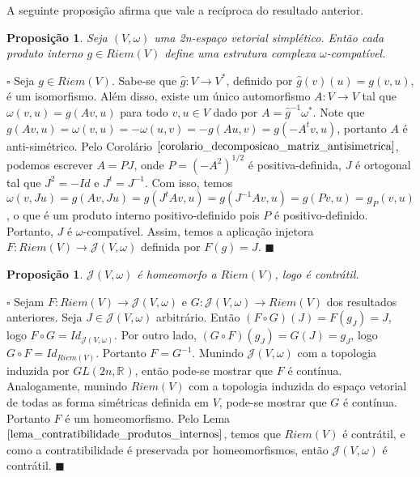\documentclass[12pt]{book}
\newtheorem{proposicao}[teorema]{Proposição}
\newenvironment{prova}[1]{$\square$ #1}{\hfill$\blacksquare$}
\newcommand{\estruturascomplexas}[2]{\mathcal{J}(#1, #2)}
\newcommand{\estruturascomplexaspadrao}{\mathcal{J}(V, \omega)}
\newcommand{\formaSimpletica}[2]{\omega(#1, #2)}
\newcommand{\generalgroup}[2]{GL(#1, #2)}
\newcommand{\generalgroupreal}[1]{\generalgroup{#1}{\real{}}}
\newcommand{\produtosinternos}[1]{Riem(#1)}
\newcommand{\real}[1]{\mathbb{R}^{#1}}
\begin{document}
	A seguinte proposição afirma que vale a recíproca do resultado anterior.
	
	\begin{proposicao}
		Seja $(V, \omega)$ uma 2n-espaço vetorial simplético. Então cada produto interno $g \in \produtosinternos{V}$ define uma estrutura complexa $\omega$-compatível.
	\end{proposicao}
	\begin{prova}
		Seja $g \in \produtosinternos{V}$. Sabe-se que $\hat{g}:V \to V^{*}$, definido por $\hat{g}(v)(u)=g(v,u)$, é um isomorfismo. Além disso, existe um único automorfismo $A:V\to V$ tal que $\formaSimpletica{v}{u} = g(Av,u)$ para todo $v,u \in V$ dado por $A = \hat{g}^{-1}\omega
		^{*}$. Note que $g(Av,u) = \formaSimpletica{v}{u} = -\formaSimpletica{u}{v} = -g(Au,v) = g(-A^{t}v,u)$, portanto $A$ é anti-simétrico. Pelo Corolário $\ref{corolario_decomposicao_matriz_antisimetrica}$, podemos escrever $A=PJ$, onde $P = (-A^{2})^{1/2}$ é positiva-definida, $J$ é ortogonal tal que $J^{2} = -Id$ e $J^{t} = J^{-1}$. Com isso, temos $\formaSimpletica{v}{Ju} = g(Av, Ju) = g(J^{t}Av, u)  = g(J^{-1}Av, u) = g(Pv, u) = g_{P}(v,u)$, o que é um produto interno positivo-definido pois $P$ é positivo-definido. Portanto, $J$ é $\omega$-compatível. Assim, temos a aplicação injetora $F: \produtosinternos{V} \to \estruturascomplexas{V}{\omega}$ definida por $F(g) = J$.
	\end{prova}
	
	\begin{proposicao}
		$\estruturascomplexaspadrao$ é homeomorfo a $\produtosinternos{V}$, logo é contrátil.
	\end{proposicao}
	\begin{prova}
		Sejam $F: \produtosinternos{V} \to \estruturascomplexaspadrao$ e $G:\estruturascomplexaspadrao \to \produtosinternos{V}$ dos resultados anteriores. Seja $J \in \estruturascomplexaspadrao$ arbitrário. Então $(F\circ G)(J) = F(g_{J}) =J$, logo $F\circ G = Id_{\estruturascomplexaspadrao}$. Por outro lado, $(G\circ F)(g_{J}) = G(J) = g_{J}$, logo $G\circ F = Id_{\produtosinternos{V}}$. Portanto $F = G^{-1}$. Munindo $\estruturascomplexaspadrao$ com a topologia induzida por $\generalgroupreal{2n}$, então pode-se mostrar que $F$ é contínua. Analogamente, munindo $\produtosinternos{V}$ com a topologia induzida do espaço vetorial de todas as forma simétricas definida em $V$, pode-se mostrar que $G$ é contínua. Portanto $F$ é um homeomorfismo. Pelo Lema $\ref{lema_contratibilidade_produtos_internos}$, temos que $\produtosinternos{V}$ é contrátil, e como a contratibilidade é preservada por homeomorfismos, então $\estruturascomplexaspadrao$ é contrátil.
	\end{prova}
	
\end{document}
